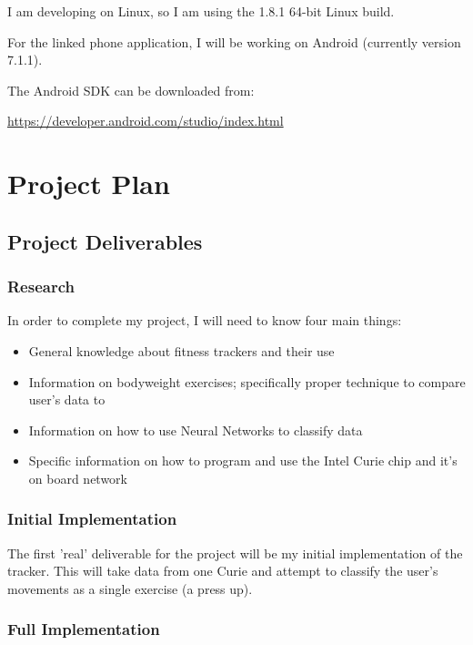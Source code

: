 \documentclass[a4paper]{article}
\begin{document}
I am developing on Linux, so I am using the 1.8.1 64-bit Linux build.

For the linked phone application, I will be working on Android (currently version 7.1.1).

The Android SDK can be downloaded from:

\url{https://developer.android.com/studio/index.html}

\newpage
\section{Project Plan}

\subsection{Project Deliverables}%

\subsubsection{Research}

In order to complete my project, I will need to know four main things:

\begin{itemize}
\item General knowledge about fitness trackers and their use
\item Information on bodyweight exercises; specifically proper technique to compare user's data to
\item Information on how to use Neural Networks to classify data
\item Specific information on how to program and use the Intel Curie chip and it's on board network
\end{itemize}

\subsubsection{Initial Implementation}

The first 'real' deliverable for the project will be my initial implementation of the tracker. This will take data from one Curie and attempt to classify the user's movements as a single exercise (a press up).

\subsubsection{Full Implementation}
\end{document}
